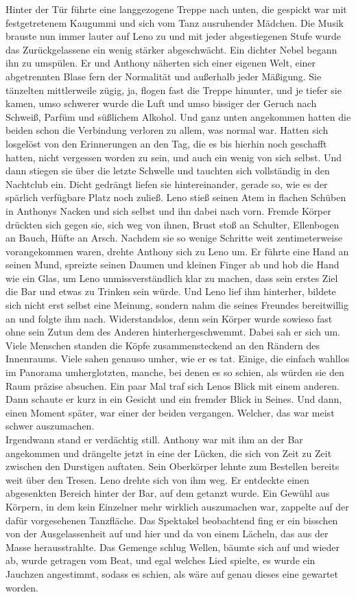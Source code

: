 \documentclass[ngerman,smalldemyvopaper,11pt,oneside,onecolumn,openright,extrafontsizes]{memoir}
\begin{document}
Hinter der Tür führte eine langgezogene Treppe nach unten, die gespickt war mit festgetretenem Kaugummi und sich vom Tanz ausruhender Mädchen. Die Musik brauste nun immer lauter auf Leno zu und mit jeder abgestiegenen Stufe wurde das Zurückgelassene ein wenig stärker abgeschwächt. Ein dichter Nebel begann ihn zu umspülen. Er und Anthony näherten sich einer eigenen Welt, einer abgetrennten Blase fern der Normalität und außerhalb jeder Mäßigung. Sie tänzelten mittlerweile zügig, ja, flogen fast die Treppe hinunter, und je tiefer sie kamen, umso schwerer wurde die Luft und umso bissiger der Geruch nach Schweiß, Parfüm und süßlichem Alkohol. Und ganz unten angekommen hatten die beiden schon die Verbindung verloren zu allem, was normal war. Hatten sich losgelöst von den Erinnerungen an den Tag, die es bis hierhin noch geschafft hatten, nicht vergessen worden zu sein, und auch ein wenig von sich selbst. Und dann stiegen sie über die letzte Schwelle und tauchten sich vollständig in den Nachtclub ein.
Dicht gedrängt liefen sie hintereinander, gerade so, wie es der spärlich verfügbare Platz noch zuließ. Leno stieß seinen Atem in flachen Schüben in Anthonys Nacken und sich selbst und ihn dabei nach vorn. Fremde Körper drückten sich gegen sie, sich weg von ihnen, Brust stoß an Schulter, Ellenbogen an Bauch, Hüfte an Arsch. Nachdem sie so wenige Schritte weit zentimeterweise vorangekommen waren, drehte Anthony sich zu Leno um. Er führte eine Hand an seinen Mund, spreizte seinen Daumen und kleinen Finger ab und hob die Hand wie ein Glas, um Leno unmissverständlich klar zu machen, dass sein erstes Ziel die Bar und etwas zu Trinken sein würde. Und Leno lief ihm hinterher, bildete sich nicht erst selbst eine Meinung, sondern nahm die seines Freundes bereitwillig an und folgte ihm nach. Widerstandslos, denn sein Körper wurde sowieso fast ohne sein Zutun dem des Anderen hinterhergeschwemmt. Dabei sah er sich um. Viele Menschen standen die Köpfe zusammensteckend an den Rändern des Innenraums. Viele sahen genauso umher, wie er es tat. Einige, die einfach wahllos im Panorama umherglotzten, manche, bei denen es so schien, als würden sie den Raum präzise absuchen. Ein paar Mal traf sich Lenos Blick mit einem anderen. Dann schaute er kurz in ein Gesicht und ein fremder Blick in Seines. Und dann, einen Moment später, war einer der beiden vergangen. Welcher, das war meist schwer auszumachen.
\vspace{0.5em} \\
Irgendwann stand er verdächtig still. Anthony war mit ihm an der Bar angekommen und drängelte jetzt in eine der Lücken, die sich von Zeit zu Zeit zwischen den Durstigen auftaten. Sein Oberkörper lehnte zum Bestellen bereits weit über den Tresen. Leno drehte sich von ihm weg. Er entdeckte einen abgesenkten Bereich hinter der Bar, auf dem getanzt wurde. Ein Gewühl aus Körpern, in dem kein Einzelner mehr wirklich auszumachen war, zappelte auf der dafür vorgesehenen Tanzfläche. Das Spektakel beobachtend fing er ein bisschen von der Ausgelassenheit auf und hier und da von einem Lächeln, das aus der Masse herausstrahlte. Das Gemenge schlug Wellen, bäumte sich auf und wieder ab, wurde getragen vom Beat, und egal welches Lied spielte, es wurde ein Jauchzen angestimmt, sodass es schien, als wäre auf genau dieses eine gewartet worden.
\end{document}
